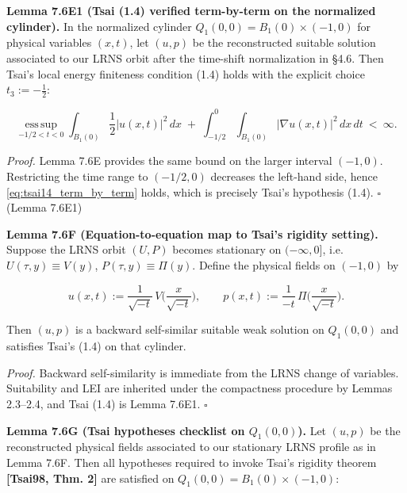 \documentclass[
  11pt,
]{article}
\begin{document}
\textbf{Lemma 7.6E1 (Tsai (1.4) verified term-by-term on the normalized cylinder).} In the normalized cylinder \(Q_1(0,0)=B_1(0)\times(-1,0)\) for physical variables \((x,t)\), let \((u,p)\) be the reconstructed suitable solution associated to our LRNS orbit after the time-shift normalization in §4.6. Then Tsai's local energy finiteness condition (1.4) holds with the explicit choice \(t_3:=-\tfrac12\):

\begin{equation}
\operatorname*{ess\,sup}_{-1/2<t<0}\int_{B_1(0)}\frac12|u(x,t)|^2\,dx
\;+\;\int_{-1/2}^{0}\int_{B_1(0)}|\nabla u(x,t)|^2\,dx\,dt\ <\ \infty.
\tag{7.6E1}\label{eq:tsai14_term_by_term}
\end{equation}

\emph{Proof.} Lemma 7.6E provides the same bound on the larger interval \((-1,0)\). Restricting the time range to \((-1/2,0)\) decreases the left-hand side, hence \eqref{eq:tsai14_term_by_term} holds, which is precisely Tsai's hypothesis (1.4). \(\square\) (Lemma 7.6E1)

\textbf{Lemma 7.6F (Equation-to-equation map to Tsai's rigidity setting).} Suppose the LRNS orbit \((U,P)\) becomes stationary on \((-\infty,0]\), i.e.~\(U(\tau,y)\equiv V(y)\), \(P(\tau,y)\equiv \Pi(y)\). Define the physical fields on \((-1,0)\) by

\begin{equation}
u(x,t):=\frac1{\sqrt{-t}}\,V\Big(\frac{x}{\sqrt{-t}}\Big),\qquad
p(x,t):=\frac1{-t}\,\Pi\Big(\frac{x}{\sqrt{-t}}\Big).
\tag{7.6F}\label{eq:tsai_map_fields}
\end{equation}

Then \((u,p)\) is a backward self-similar suitable weak solution on \(Q_1(0,0)\) and satisfies Tsai's (1.4) on that cylinder.

\emph{Proof.} Backward self-similarity is immediate from the LRNS change of variables. Suitability and LEI are inherited under the compactness procedure by Lemmas 2.3--2.4, and Tsai (1.4) is Lemma 7.6E1. \(\square\)

\textbf{Lemma 7.6G (Tsai hypotheses checklist on \(Q_1(0,0)\)).} Let \((u,p)\) be the reconstructed physical fields associated to our stationary LRNS profile as in Lemma 7.6F. Then all hypotheses required to invoke Tsai's rigidity theorem \textbf{{[}Tsai98, Thm. 2{]}} are satisfied on \(Q_1(0,0)=B_1(0)\times(-1,0)\):
\end{document}
